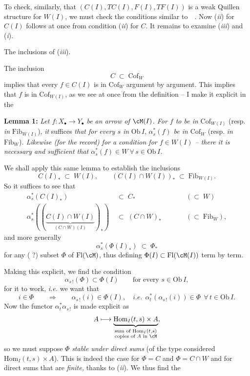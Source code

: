 To check, similarly, that $(C(I),TC(I),F(I),TF(I))$ is a weak Quillen structure for $W(I)$, we must check the conditions similar to \,\, . Now (\textit{ii}) for $C(I)$ follows at once from condition (\textit{ii}) for $C$. It remains to examine (\textit{iii}) and (\textit{i}).

The inclusions of (\textit{iii}).

The inclusion
\[
C\;\subset\;\mathrm{Cof}_W
\]
implies that every $f\in C(I)$ is in $\mathrm{Cof}_W$ argument by argument. This implies that $f$ is in $\mathrm{Cof}_{W(I)}$, as we see at once from the definition – I make it explicit in the

\textbf{Lemma 1:} \textit{Let $f : X_\bullet\longrightarrow Y_\bullet$ be an arrow of $\cM(I)$. For $f$ to be in} $\mathrm{Cof}_{W(I)}$ (resp. \textit{in} $\mathrm{Fib}_{W(I)}$), \textit{it} suffices \textit{that for every $s$ in} $\mathrm{Ob}\,I$, \textit{$\alpha_s^*(f)$ be in} $\mathrm{Cof}_W$ (resp. \textit{in} $\mathrm{Fib}_W$)\textit{. Likewise (for the record) for a condition for $f\in W(I)$ – there it is necessary and sufficient that $\alpha_s^*(f)\in W\ \forall\, s\in\mathrm{Ob}\,I$.}

We shall apply this same lemma to establish the inclusions
\[
C(I)_* \;\subset\; W(I), \qquad (C(I)\cap W(I))_* \;\subset\; \mathrm{Fib}_{W(I)}.
\]
So it suffices to see that
\[
\begin{aligned}
\alpha_s^*(C(I)_*) \;&\subset\; C_* &&\qquad (\subset\; W)\\
\alpha_s^*((\underbrace{C(I)\cap W(I)}_{(C\cap W)(I)})_*) \;&\subset\; (C\cap W)_* &&\qquad (\subset\; \mathrm{Fib}_W),
\end{aligned}
\]
and more generally
\[
\alpha_s^*(\Phi(I)_*) \;\subset\; \Phi_* \tag*{(7)}
\]
for any ( ?) subset $\Phi$ of $\mathrm{Fl}(\cM)$, thus defining $\Phi(I)\subset\mathrm{Fl}(\cM(I))$ term by term.

Making this explicit, we find the condition
\[
\alpha_{s\,!}(\Phi)\subset\Phi(I) \qquad \text{for every } s\in\mathrm{Ob}\,I,
\]
for it to work, \textit{i.e.} we want that
\[
i\in\Phi \qquad\Longrightarrow\qquad \alpha_{s\,!}(i)\in\Phi(I), \quad \textit{i.e.}\ \ \alpha_t^*(\alpha_{s\,!}(i))\in\Phi\ \ \forall\, t\in\mathrm{Ob}\,I.
\]
Now the functor $\alpha_t^*\alpha_{s\,!}$ is made explicit as
\[
A \longmapsto \underbrace{\mathrm{Hom}_I(t,s)\times A}_{\substack{\text{sum of } \mathrm{Hom}_I(t,s)\\ \text{copies of } A \text{ in } \cM}},
\]
so we must suppose $\Phi$ \textit{stable under direct sums} (of the type considered $\mathrm{Hom}_I(t,s)\times A$). This is indeed the case for $\Phi = C$ and $\Phi = C\cap W$ and for direct sums that are \textit{finite,} thanks to (\textit{ii}). We thus find the

